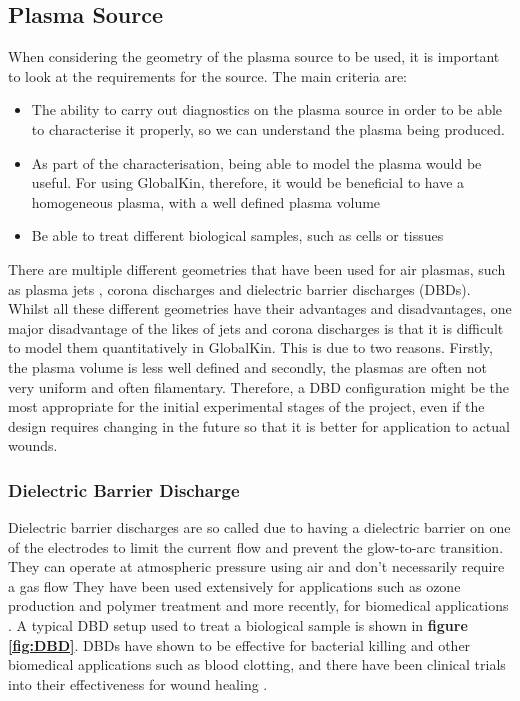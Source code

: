\documentclass[11pt, oneside]{article}   	%
\begin{document}
\subsection{Plasma Source}
When considering the geometry of the plasma source to be used, it is important to look at the requirements for the source.
The main criteria are:
\begin{itemize}
\item The ability to carry out diagnostics on the plasma source in order to be able to characterise it properly, so we can understand the plasma being produced. 
\item As part of the characterisation, being able to model the plasma would be useful. For using GlobalKin, therefore, it would be beneficial to have a homogeneous plasma, with a well defined plasma volume
\item Be able to treat different biological samples, such as cells or tissues
\end{itemize}

There are multiple different geometries that have been used for air plasmas, such as plasma jets \cite{Pei2012inactivation, Chen2009blood, Walsh2011portable}, corona discharges \cite{Dobrynin2011inactivation} and dielectric barrier discharges (DBDs).
Whilst all these different geometries have their advantages and disadvantages, one major disadvantage of the likes of jets and corona discharges is that it is difficult to model them quantitatively in GlobalKin.
This is due to two reasons.
Firstly, the plasma volume is less well defined and secondly, the plasmas are often not very uniform and often filamentary.
Therefore, a DBD configuration might be the most appropriate for the initial experimental stages of the project, even if the design requires changing in the future so that it is better for application to actual wounds.


\subsubsection{Dielectric Barrier Discharge}
Dielectric barrier discharges are so called due to having a dielectric barrier on one of the electrodes to limit the current flow and prevent the glow-to-arc transition. 
They can operate at atmospheric pressure using air and don't necessarily require a gas flow \cite{Fridman2013plasmamedicine}
They have been used extensively for applications such as ozone production and polymer treatment and more recently, for biomedical applications \cite{Fridman2013plasmamedicine, Brehmer2015alleviation}.
A typical DBD setup used to treat a biological sample is shown in \textbf{figure \ref{fig:DBD}}.
DBDs have shown to be effective for bacterial killing and other biomedical applications such as blood clotting, and there have been clinical trials into their effectiveness for wound healing \cite{Daeschlein2012in, Fridman2006blood, Brehmer2015alleviation}. 
\end{document}
